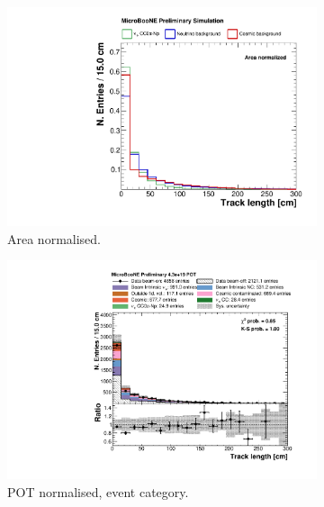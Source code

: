 \begin{figure}[htbp]
\centering
  \begin{subfigure}{0.49\textwidth}
    \includegraphics[width=\linewidth]{figures/h_track_length_norm.pdf}
    \caption{Area normalised.} \label{fig:length_norm}
  \end{subfigure}
  \begin{subfigure}{0.49\textwidth}
    \includegraphics[width=\linewidth]{figures/h_track_length.pdf}
    \caption{POT normalised, event category.} \label{fig:length_pot}
  \end{subfigure}
  \begin{subfigure}{0.49\textwidth}

\end{subfigure}
\end{figure}

